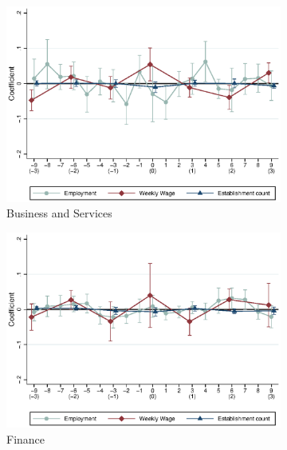 \documentclass{article}
\begin{document}
\clearpage 
\begin{figure}\centering
	\captionsetup[subfigure]{justification=centering}
	\caption{Dynamic Model: Time Varying Economic Controls}
	\begin{subfigure}[b]{.49\textwidth}
		\centering
		\includegraphics[width = \textwidth]{../../analysis/first_differences_controls/output/fd_models_bizserv_w3.eps}
		\caption{Business and Services}
	\end{subfigure}
	\begin{subfigure}[b]{.49\textwidth}
		\centering
		\includegraphics[width = \textwidth]{../../analysis/first_differences_controls/output/fd_models_fin_w3.eps}
		\caption{Finance}
	\end{subfigure}
	\quad 
	\begin{subfigure}[b]{.48\textwidth}

\end{subfigure}
\end{figure}
\end{document}
